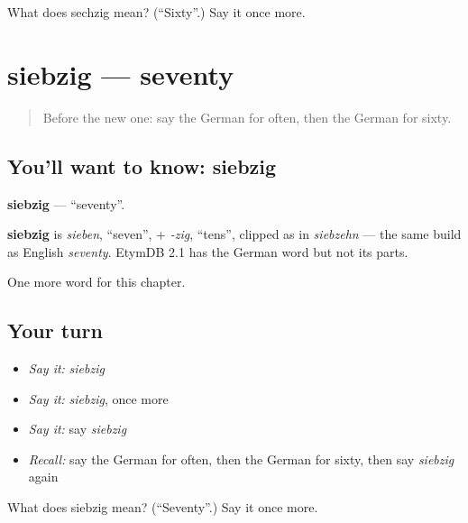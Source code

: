 \begin{tcolorbox}[breakable,colback=teal!4,colframe=teal!35!black,title={Before you move on}]
What does sechzig mean? (\textquotedblleft{}Sixty\textquotedblright{}.) Say it once more.
\end{tcolorbox}
\section[siebzig]{siebzig — seventy}

\label{lesson:GE-C138-siebzig}



\begin{quote}
Before the new one: say the German for often, then the German for sixty.
\end{quote}

\subsection*{You'll want to know: siebzig}
\textbf{siebzig} — \textquotedblleft{}seventy\textquotedblright{}.

\begin{cousinweb}
\textbf{siebzig} is \emph{sieben}, \textquotedblleft{}seven\textquotedblright{}, + \emph{-zig}, \textquotedblleft{}tens\textquotedblright{}, clipped as in \emph{siebzehn} — the same build as English \emph{seventy}. EtymDB 2.1 has the German word but not its parts.
\end{cousinweb}

\begin{grammarlens}[title={What you've built}]
One more word for this chapter.
\end{grammarlens}

\subsection*{Your turn}
\begin{itemize}
\raggedright
  \item \emph{Say it:} \emph{siebzig}
  \item \emph{Say it:} \emph{siebzig}, once more
  \item \emph{Say it:} say \emph{siebzig}
  \item \emph{Recall:} say the German for often, then the German for sixty, then say \emph{siebzig} again
\end{itemize}

\begin{tcolorbox}[breakable,colback=teal!4,colframe=teal!35!black,title={Before you move on}]
What does siebzig mean? (\textquotedblleft{}Seventy\textquotedblright{}.) Say it once more.
\end{tcolorbox}
